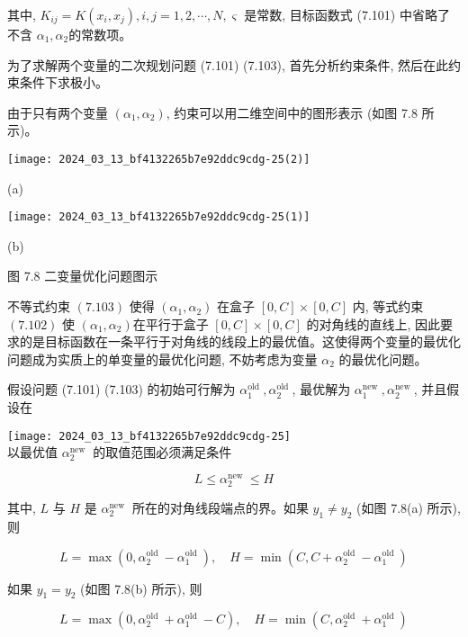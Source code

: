\documentclass[10pt]{article}
\begin{document}
其中, $K_{i j}=K\left(x_{i}, x_{j}\right), i, j=1,2, \cdots, N, \varsigma$ 是常数, 目标函数式 (7.101) 中省略了不含 $\alpha_{1}, \alpha_{2}$的常数项。

为了求解两个变量的二次规划问题 (7.101) (7.103), 首先分析约束条件, 然后在此约束条件下求极小。

由于只有两个变量 $\left(\alpha_{1}, \alpha_{2}\right)$, 约束可以用二维空间中的图形表示 (如图 7.8 所示)。

\begin{center}
\texttt{[image: 2024\_03\_13\_bf4132265b7e92ddc9cdg-25(2)]}
\end{center}

(a)

\begin{center}
\texttt{[image: 2024\_03\_13\_bf4132265b7e92ddc9cdg-25(1)]}
\end{center}

(b)

图 7.8 二变量优化问题图示

不等式约束 $(7.103)$ 使得 $\left(\alpha_{1}, \alpha_{2}\right)$ 在盒子 $[0, C] \times[0, C]$ 内, 等式约束 $(7.102)$ 使 $\left(\alpha_{1}, \alpha_{2}\right)$在平行于盒子 $[0, C] \times[0, C]$ 的对角线的直线上, 因此要求的是目标函数在一条平行于对角线的线段上的最优值。这使得两个变量的最优化问题成为实质上的单变量的最优化问题, 不妨考虑为变量 $\alpha_{2}$ 的最优化问题。

假设问题 (7.101) (7.103) 的初始可行解为 $\alpha_{1}^{\text {old }}, \alpha_{2}^{\text {old }}$, 最优解为 $\alpha_{1}^{\text {new }}, \alpha_{2}^{\text {new }}$, 并且假设在

\texttt{[image: 2024\_03\_13\_bf4132265b7e92ddc9cdg-25]}\\
以最优值 $\alpha_{2}^{\text {new }}$ 的取值范围必须满足条件

$$
L \leqslant \alpha_{2}^{\text {new }} \leqslant H
$$

其中, $L$ 与 $H$ 是 $\alpha_{2}^{\text {new }}$ 所在的对角线段端点的界。如果 $y_{1} \neq y_{2}$ (如图 7.8(a) 所示), 则

$$
L=\max \left(0, \alpha_{2}^{\text {old }}-\alpha_{1}^{\text {old }}\right), \quad H=\min \left(C, C+\alpha_{2}^{\text {old }}-\alpha_{1}^{\text {old }}\right)
$$

如果 $y_{1}=y_{2}$ (如图 7.8(b) 所示), 则

$$
L=\max \left(0, \alpha_{2}^{\text {old }}+\alpha_{1}^{\text {old }}-C\right), \quad H=\min \left(C, \alpha_{2}^{\text {old }}+\alpha_{1}^{\text {old }}\right)
$$
\end{document}

